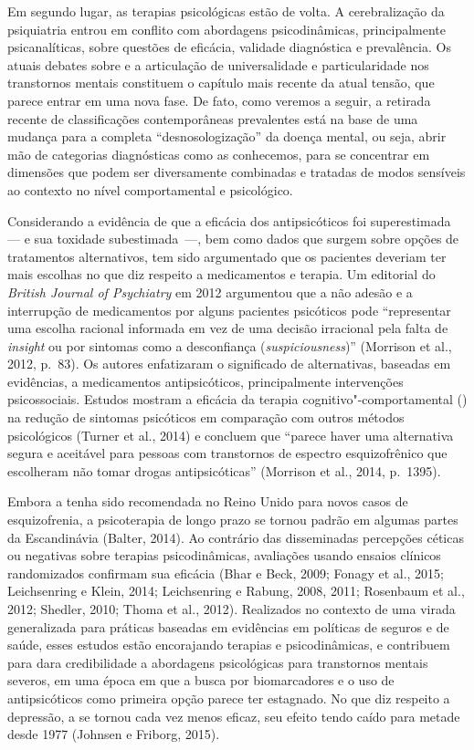 Em segundo lugar, as terapias psicológicas estão de volta. A
cerebralização da psiquiatria entrou em conflito com abordagens
psicodinâmicas, principalmente psicanalíticas, sobre questões de
eficácia, validade diagnóstica e prevalência. Os atuais debates sobre
 e a articulação de universalidade e particularidade nos transtornos
mentais constituem o capítulo mais recente da atual tensão, que parece
entrar em uma nova fase. De fato, como veremos a seguir, a retirada
recente de classificações contemporâneas prevalentes está na base de uma
mudança para a completa ``desnosologização'' da doença mental, ou seja,
abrir mão de categorias diagnósticas como as conhecemos, para se
concentrar em dimensões que podem ser diversamente combinadas e tratadas
de modos sensíveis ao contexto no nível comportamental e psicológico.

Considerando a evidência de que a eficácia dos antipsicóticos foi
superestimada --- e sua toxidade subestimada~---, bem como dados que
surgem sobre opções de tratamentos alternativos, tem sido argumentado
que os pacientes deveriam ter mais escolhas no que diz respeito a
medicamentos e terapia. Um editorial do \emph{British Journal of
Psychiatry} em 2012 argumentou que a não adesão e a interrupção de
medicamentos por alguns pacientes psicóticos pode ``representar uma
escolha racional informada em vez de uma decisão irracional pela falta
de \emph{insight} ou por sintomas como a desconfiança
(\emph{suspiciousness})'' (Morrison et al., 2012, p.~83). Os autores
enfatizaram o significado de alternativas, baseadas em evidências, a
medicamentos antipsicóticos, principalmente intervenções psicossociais.
Estudos mostram a eficácia da terapia cognitivo"-comportamental () na
redução de sintomas psicóticos em comparação com outros métodos
psicológicos (Turner et al., 2014) e concluem que ``parece haver uma
alternativa segura e aceitável para pessoas com transtornos de espectro
esquizofrênico que escolheram não tomar drogas antipsicóticas''
(Morrison et al., 2014, p.~1395).

Embora a  tenha sido recomendada no Reino Unido para novos casos de
esquizofrenia, a psicoterapia de longo prazo se tornou padrão em algumas
partes da Escandinávia (Balter, 2014). Ao contrário das disseminadas
percepções céticas ou negativas sobre terapias psicodinâmicas,
avaliações usando ensaios clínicos randomizados confirmam sua eficácia
(Bhar e Beck, 2009; Fonagy et al., 2015; Leichsenring e Klein, 2014;
Leichsenring e Rabung, 2008, 2011; Rosenbaum et al., 2012; Shedler,
2010; Thoma et al., 2012). Realizados no contexto de uma virada
generalizada para práticas baseadas em evidências em políticas de
seguros e de saúde, esses estudos estão encorajando terapias  e
psicodinâmicas, e contribuem para dara credibilidade a abordagens
psicológicas para transtornos mentais severos, em uma época em que a
busca por biomarcadores e o uso de antipsicóticos como primeira opção
parece ter estagnado. No que diz respeito a depressão, a  se tornou
cada vez menos eficaz, seu efeito tendo caído para metade desde 1977
(Johnsen e Friborg, 2015).

